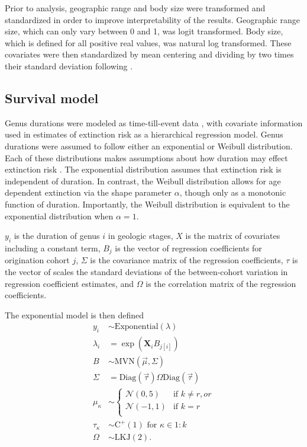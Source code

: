 \documentclass[12pt,letterpaper]{article}
\begin{document}
Prior to analysis, geographic range and body size were transformed and standardized in order to improve interpretability of the results. Geographic range size, which can only vary between 0 and 1, was logit transformed. Body size, which is defined for all positive real values, was natural log transformed. These covariates were then standardized by mean centering and dividing by two times their standard deviation following \citet{Gelman2007}.


\subsection{Survival model}
Genus durations were modeled as time-till-event data \citep{Klein2003}, with covariate information used in estimates of extinction risk as a hierarchical regression model. Genus durations were assumed to follow either an exponential or Weibull distribution. Each of these distributions makes assumptions about how duration may effect extinction risk \citep{Klein2003}. The exponential distribution assumes that extinction risk is independent of duration. In contrast, the Weibull distribution allows for age dependent extinction via the shape parameter \(\alpha\), though only as a monotonic function of duration. Importantly, the Weibull distribution is equivalent to the exponential distribution when \(\alpha = 1\). 

\(y_{i}\) is the duration of genus \(i\) in geologic stages, \(X\) is the matrix of covariates including a constant term, \(B_{j}\) is the vector of regression coefficients for origination cohort \(j\), \(\Sigma\) is the covariance matrix of the regression coefficients, \(\tau\) is the vector of scales the standard deviations of the between-cohort variation in regression coefficient estimates, and \(\Omega\) is the correlation matrix of the regression coefficients.

The exponential model is then defined
\begin{equation}
  \begin{aligned}
    y_{i} &\sim \mathrm{Exponential}(\lambda) \\
    \lambda_{i} &= \exp(\mathbf{X}_{i} B_{j[i]}) \\
    B &\sim \mathrm{MVN}(\vec{\mu}, \Sigma) \\
    \Sigma &= \text{Diag}(\vec{\tau}) \Omega \text{Diag}(\vec{\tau}) \\
    \mu_{\kappa} &\sim 
    \begin{cases} 
      \mathcal{N}(0, 5) & \text{if } k \neq r, or \\
      \mathcal{N}(-1, 1) & \text{if } k = r \\
    \end{cases} \\
    \tau_{\kappa} &\sim \mathrm{C^{+}}(1) \text{ for } \kappa \in 1:k \\
    \Omega &\sim \text{LKJ}(2).
  \end{aligned}
  \label{eq:exp_total}
\end{equation}
\end{document}
